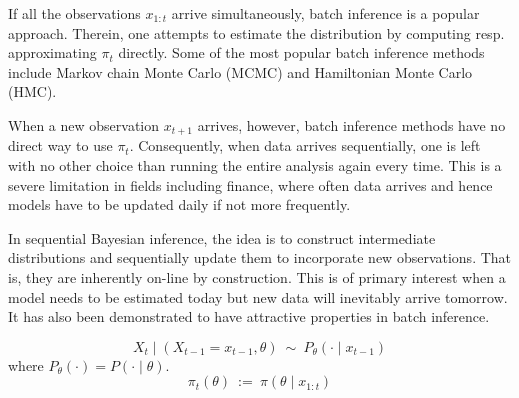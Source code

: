 If all the observations $x_{1:t}$ arrive simultaneously, batch inference is a popular approach. Therein, one attempts to estimate the distribution by computing resp. approximating $\pi_t$ directly. Some of the most popular batch inference methods include Markov chain Monte Carlo (MCMC) and Hamiltonian Monte Carlo (HMC).

When a new observation $x_{t+1}$ arrives, however, batch inference methods have no direct way to use $\pi_t$. Consequently, when data arrives sequentially, one is left with no other choice than running the entire analysis again every time. This is a severe limitation in fields including finance, where often data arrives and hence models have to be updated daily if not more frequently.

In sequential Bayesian inference, the idea is to construct intermediate distributions and sequentially update them to incorporate new observations. That is, they are inherently on-line by construction. This is of primary interest when a model needs to be estimated today but new data will inevitably arrive tomorrow. It has also been demonstrated to have attractive properties in batch inference.

\begin{equation*}
X_t \mid (X_{t-1} = x_{t-1}, \theta) ~ \sim ~ P_\theta(\cdot \mid x_{t-1})
\end{equation*}
where $P_\theta(\cdot) = P(\cdot \mid \theta)$.
\begin{equation*}
\pi_t(\theta) ~ := ~ \pi(\theta \mid x_{1:t})
\end{equation*}

